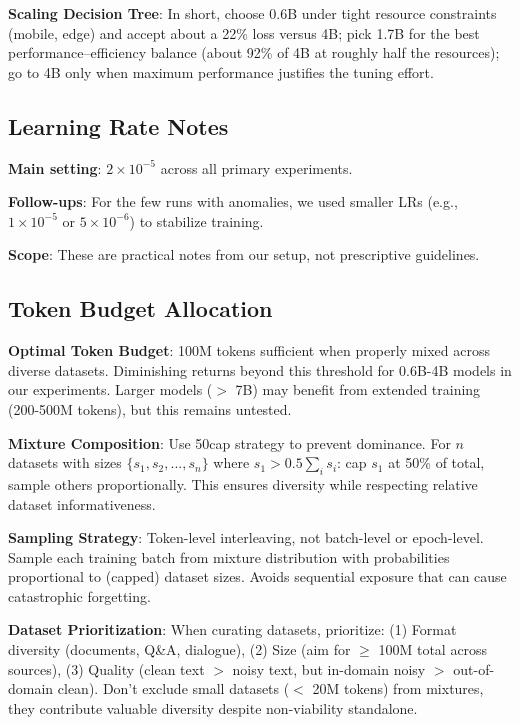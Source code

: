 \textbf{Scaling Decision Tree}: In short, choose 0.6B under tight resource constraints (mobile, edge) and accept about a 22\% loss versus 4B; pick 1.7B for the best performance–efficiency balance (about 92\% of 4B at roughly half the resources); go to 4B only when maximum performance justifies the tuning effort.

\subsection{Learning Rate Notes}

\textbf{Main setting}: $2 \times 10^{-5}$ across all primary experiments.

\textbf{Follow-ups}: For the few runs with anomalies, we used smaller LRs (e.g., $1\times10^{-5}$ or $5\times10^{-6}$) to stabilize training.

\textbf{Scope}: These are practical notes from our setup, not prescriptive guidelines.

\subsection{Token Budget Allocation}

\textbf{Optimal Token Budget}: 100M tokens sufficient when properly mixed across diverse datasets. Diminishing returns beyond this threshold for 0.6B-4B models in our experiments. Larger models ($>$ 7B) may benefit from extended training (200-500M tokens), but this remains untested.

\textbf{Mixture Composition}: Use 50cap strategy to prevent dominance. For $n$ datasets with sizes $\{s_1, s_2, ..., s_n\}$ where $s_1 > 0.5 \sum_i s_i$: cap $s_1$ at 50\% of total, sample others proportionally. This ensures diversity while respecting relative dataset informativeness.

\textbf{Sampling Strategy}: Token-level interleaving, not batch-level or epoch-level. Sample each training batch from mixture distribution with probabilities proportional to (capped) dataset sizes. Avoids sequential exposure that can cause catastrophic forgetting.

\textbf{Dataset Prioritization}: When curating datasets, prioritize: (1) Format diversity (documents, Q\&A, dialogue), (2) Size (aim for $\geq$ 100M total across sources), (3) Quality (clean text $>$ noisy text, but in-domain noisy $>$ out-of-domain clean). Don't exclude small datasets ($<$ 20M tokens) from mixtures, they contribute valuable diversity despite non-viability standalone.

